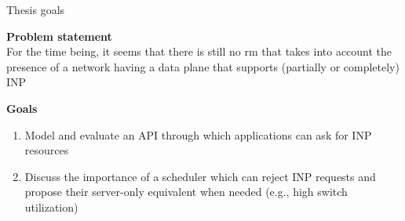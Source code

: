 \begin{frame}[fragile]{Thesis goals}
    
    \textbf{Problem statement}\\
    For the time being, it seems that there is still no \gls{rm} that takes into account the presence of a network having a data plane that supports (partially or completely) INP

    \vspace{5mm}

    \textbf{Goals}\\
    \begin{enumerate}
        \item Model and evaluate an API through which applications can ask for INP resources
        \item Discuss the importance of a scheduler which can reject INP requests and propose their server-only equivalent when needed (e.g., high switch utilization)
    \end{enumerate}

\end{frame}
